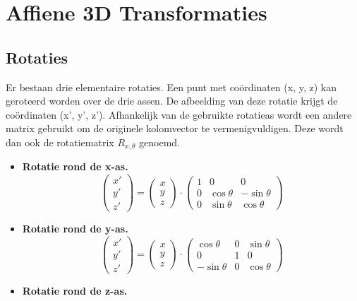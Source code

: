 \documentclass{report}
\begin{document}
	\section{Affiene 3D Transformaties}
	\subsection{Rotaties}
	Er bestaan drie elementaire rotaties. Een punt met coördinaten (x, y, z) kan geroteerd worden over de drie assen. De afbeelding van deze rotatie krijgt de coördinaten (x', y', z'). Afhankelijk van de gebruikte rotatieas wordt een andere matrix gebruikt om de originele kolomvector te vermenigvuldigen. Deze wordt dan ook de rotatiematrix \textbf{$R_{x, \theta}$} genoemd.
	\begin{itemize}
		\item \textbf{Rotatie rond de x-as.}
			\[
				\begin{pmatrix}
					x' \\
					y' \\
					z'
				\end{pmatrix}
				=
				\begin{pmatrix}
					x \\
					y \\
					z
				\end{pmatrix}
				\cdot
				\begin{pmatrix}
					1 & 0 & 0 \\
					0 & \cos \theta & - \sin \theta \\
					0 & \sin \theta &   \cos \theta  
				\end{pmatrix}
			\]
		\item \textbf{Rotatie rond de y-as.}
					\[
						\begin{pmatrix}
						x' \\
						y' \\
						z'
						\end{pmatrix}
						=
						\begin{pmatrix}
						x \\
						y \\
						z
						\end{pmatrix}
						\cdot
						\begin{pmatrix}
						\cos \theta & 0 & \sin \theta \\
						0 & 1 & 0 \\
						- \sin \theta & 0 & \cos \theta
						\end{pmatrix}
					\]
		\item \textbf{Rotatie rond de z-as.}

\end{itemize}
\end{document}

